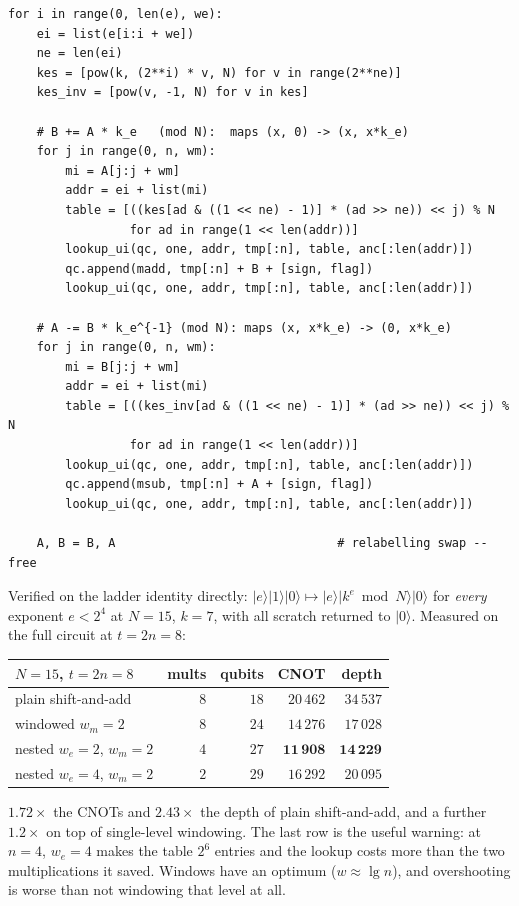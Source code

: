 \documentclass[11pt]{article}
\renewcommand{\ket}[1]{\lvert #1 \rangle}
\theoremstyle{plain}
\theoremstyle{remark}
\begin{document}
\begin{lstlisting}
for i in range(0, len(e), we):
    ei = list(e[i:i + we])
    ne = len(ei)
    kes = [pow(k, (2**i) * v, N) for v in range(2**ne)]
    kes_inv = [pow(v, -1, N) for v in kes]

    # B += A * k_e   (mod N):  maps (x, 0) -> (x, x*k_e)
    for j in range(0, n, wm):
        mi = A[j:j + wm]
        addr = ei + list(mi)
        table = [((kes[ad & ((1 << ne) - 1)] * (ad >> ne)) << j) % N
                 for ad in range(1 << len(addr))]
        lookup_ui(qc, one, addr, tmp[:n], table, anc[:len(addr)])
        qc.append(madd, tmp[:n] + B + [sign, flag])
        lookup_ui(qc, one, addr, tmp[:n], table, anc[:len(addr)])

    # A -= B * k_e^{-1} (mod N): maps (x, x*k_e) -> (0, x*k_e)
    for j in range(0, n, wm):
        mi = B[j:j + wm]
        addr = ei + list(mi)
        table = [((kes_inv[ad & ((1 << ne) - 1)] * (ad >> ne)) << j) % N
                 for ad in range(1 << len(addr))]
        lookup_ui(qc, one, addr, tmp[:n], table, anc[:len(addr)])
        qc.append(msub, tmp[:n] + A + [sign, flag])
        lookup_ui(qc, one, addr, tmp[:n], table, anc[:len(addr)])

    A, B = B, A                               # relabelling swap -- free
\end{lstlisting}

\noindent
Verified on the ladder identity directly: $\ket e\ket1\ket0\mapsto\ket e\ket{k^e\bmod N}\ket0$ for
\emph{every} exponent $e<2^4$ at $N=15$, $k=7$, with all scratch returned to $\ket0$. Measured on
the full circuit at $t=2n=8$:

\begin{center}\small
\begin{tabular}{@{}lrrrr@{}}
\toprule
$N=15$, $t=2n=8$ & mults & qubits & CNOT & depth\\
\midrule
plain shift-and-add       & $8$ & $18$ & $20\,462$ & $34\,537$\\
windowed $w_m=2$          & $8$ & $24$ & $14\,276$ & $17\,028$\\
nested $w_e=2$, $w_m=2$   & $4$ & $27$ & $\mathbf{11\,908}$ & $\mathbf{14\,229}$\\
nested $w_e=4$, $w_m=2$   & $2$ & $29$ & $16\,292$ & $20\,095$\\
\bottomrule
\end{tabular}
\end{center}

\noindent
$1.72\times$ the CNOTs and $2.43\times$ the depth of plain shift-and-add, and a further $1.2\times$
on top of single-level windowing. The last row is the useful warning: at $n=4$, $w_e=4$ makes the
table $2^{6}$ entries and the lookup costs more than the two multiplications it saved. Windows
have an optimum ($w\approx\lg n$), and overshooting is worse than not windowing that level at all.
\end{document}
